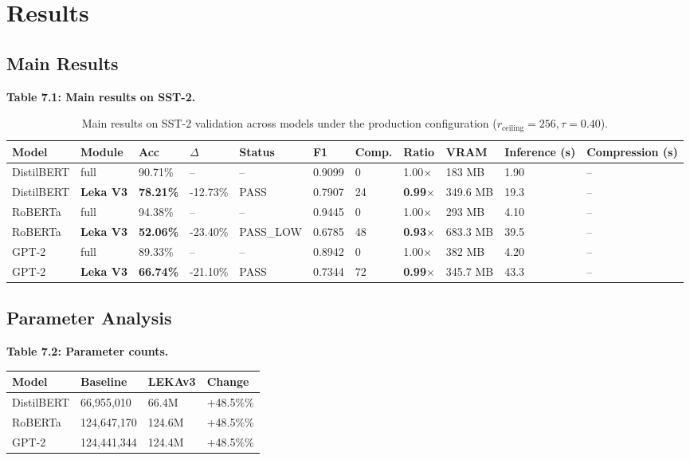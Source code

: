 \section{Results}

\subsection{Main Results}

\textbf{Table 7.1: Main results on SST-2.}

\begin{table}[t]
\centering
\small
\begin{tabular}{lllllllllll}
\toprule
\textbf{Model} & \textbf{Module} & \textbf{Acc} & \textbf{$\Delta$} & \textbf{Status} & \textbf{F1} & \textbf{Comp.} & \textbf{Ratio} & \textbf{VRAM} & \textbf{Inference (s)} & \textbf{Compression (s)} \\
\midrule
DistilBERT & full & 90.71\% & -- & -- & 0.9099 & 0 & 1.00$\times$ & 183 MB & 1.90 & -- \\
DistilBERT & \textbf{Leka V3} & \textbf{78.21\%} & -12.73\% & PASS & 0.7907 & 24 & \textbf{0.99$\times$} & 349.6 MB & 19.3 & -- \\
RoBERTa & full & 94.38\% & -- & -- & 0.9445 & 0 & 1.00$\times$ & 293 MB & 4.10 & -- \\
RoBERTa & \textbf{Leka V3} & \textbf{52.06\%} & -23.40\% & PASS_LOW & 0.6785 & 48 & \textbf{0.93$\times$} & 683.3 MB & 39.5 & -- \\
GPT-2 & full & 89.33\% & -- & -- & 0.8942 & 0 & 1.00$\times$ & 382 MB & 4.20 & -- \\
GPT-2 & \textbf{Leka V3} & \textbf{66.74\%} & -21.10\% & PASS & 0.7344 & 72 & \textbf{0.99$\times$} & 345.7 MB & 43.3 & -- \\
\bottomrule
\end{tabular}
\caption{Main results on SST-2 validation across models under the production configuration ($r_{\mathrm{ceiling}}=256, \tau=0.40$).}
\label{tab:main_sst2}
\end{table}

\subsection{Parameter Analysis}

\textbf{Table 7.2: Parameter counts.}

\begin{table}[H]
\centering
\small
\begin{tabular}{llll}
\toprule
\textbf{Model} & \textbf{Baseline} & \textbf{LEKAv3} & \textbf{Change} \\
\midrule
DistilBERT & 66,955,010 & 66.4M & +48.5\%\% \\
RoBERTa & 124,647,170 & 124.6M & +48.5\%\% \\
GPT-2 & 124,441,344 & 124.4M & +48.5\%\% \\
\bottomrule
\end{tabular}
\end{table}


